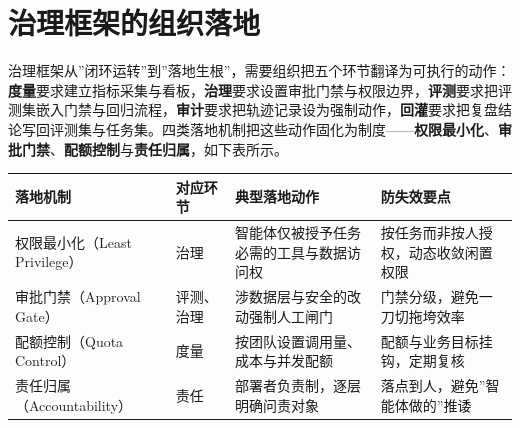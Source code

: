 \documentclass[12pt,a4paper,twoside,openany]{ctexbook}
\numberwithin{figure}{chapter}
\numberwithin{table}{chapter}
\newcounter{none}
\begin{document}
\section{治理框架的组织落地}\label{ux6cbbux7406ux6846ux67b6ux7684ux7ec4ux7ec7ux843dux5730}

治理框架从''闭环运转''到''落地生根''，需要组织把五个环节翻译为可执行的动作：\textbf{度量}要求建立指标采集与看板，\textbf{治理}要求设置审批门禁与权限边界，\textbf{评测}要求把评测集嵌入门禁与回归流程，\textbf{审计}要求把轨迹记录设为强制动作，\textbf{回灌}要求把复盘结论写回评测集与任务集。四类落地机制把这些动作固化为制度------\textbf{权限最小化}、\textbf{审批门禁}、\textbf{配额控制}与\textbf{责任归属}，如下表所示。

{\def\LTcaptype{none} %
\begin{longtable}[]{@{}
  >{\raggedright\arraybackslash}p{}
  >{\raggedright\arraybackslash}p{}
  >{\raggedright\arraybackslash}p{}
  >{\raggedright\arraybackslash}p{}@{}}
\toprule\noalign{}
\begin{minipage}[b]{\linewidth}\raggedright
落地机制
\end{minipage} & \begin{minipage}[b]{\linewidth}\raggedright
对应环节
\end{minipage} & \begin{minipage}[b]{\linewidth}\raggedright
典型落地动作
\end{minipage} & \begin{minipage}[b]{\linewidth}\raggedright
防失效要点
\end{minipage} \\
\midrule\noalign{}
\endhead
\bottomrule\noalign{}
\endlastfoot
权限最小化（Least Privilege） & 治理 &
智能体仅被授予任务必需的工具与数据访问权 &
按任务而非按人授权，动态收敛闲置权限 \\
审批门禁（Approval Gate） & 评测、治理 &
涉数据层与安全的改动强制人工闸门 & 门禁分级，避免一刀切拖垮效率 \\
配额控制（Quota Control） & 度量 & 按团队设置调用量、成本与并发配额 &
配额与业务目标挂钩，定期复核 \\
责任归属（Accountability） & 责任 & 部署者负责制，逐层明确问责对象 &
落点到人，避免''智能体做的''推诿 \\
\end{longtable}
}
\end{document}
